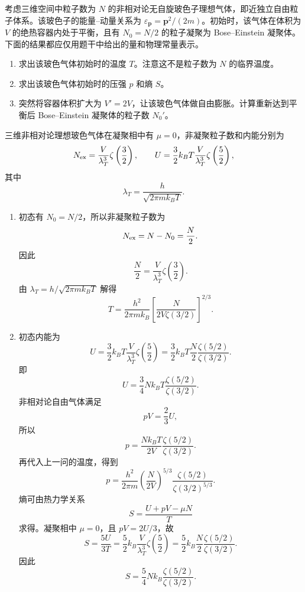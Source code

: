 \begin{question}[25 分]
考虑三维空间中粒子数为 $N$ 的非相对论无自旋玻色子理想气体，即近独立自由粒子体系。该玻色子的能量--动量关系为 $\varepsilon_{\mathbf p}=\mathbf p^2/(2m)$。初始时，该气体在体积为 $V$ 的绝热容器内处于平衡，且有 $N_0=N/2$ 的粒子凝聚为 Bose--Einstein 凝聚体。下面的结果都应仅用题干中给出的量和物理常量表示。
\begin{enumerate}
    \item 求出该玻色气体初始时的温度 $T$。注意这不是粒子数为 $N$ 的临界温度。
    \item 求出该玻色气体初始时的压强 $p$ 和熵 $S$。
    \item 突然将容器体积扩大为 $V'=2V$，让该玻色气体做自由膨胀。计算重新达到平衡后 Bose--Einstein 凝聚体的粒子数 $N_0'$。
\end{enumerate}
\begin{solution}
三维非相对论理想玻色气体在凝聚相中有 $\mu=0$，非凝聚粒子数和内能分别为
\[
    N_{\rm ex}=\frac{V}{\lambda_T^3}\zeta\left(\frac{3}{2}\right),
    \qquad
    U=\frac{3}{2}k_BT\frac{V}{\lambda_T^3}\zeta\left(\frac{5}{2}\right),
\]
其中
\[
    \lambda_T=\frac{h}{\sqrt{2\pi mk_BT}}.
\]
\begin{enumerate}
    \item 初态有 $N_0=N/2$，所以非凝聚粒子数为
    \[
        N_{\rm ex}=N-N_0=\frac{N}{2}.
    \]
    因此
    \[
        \frac{N}{2}=\frac{V}{\lambda_T^3}\zeta\left(\frac{3}{2}\right).
    \]
    由 $\lambda_T=h/\sqrt{2\pi mk_BT}$ 解得
    \[
        \boxed{T=\frac{h^2}{2\pi mk_B}
        \left[\frac{N}{2V\zeta(3/2)}\right]^{2/3}.}
    \]

    \item 初态内能为
    \[
        U=\frac{3}{2}k_BT\frac{V}{\lambda_T^3}\zeta\left(\frac{5}{2}\right)
        =\frac{3}{2}k_BT\frac{N}{2}\frac{\zeta(5/2)}{\zeta(3/2)}.
    \]
    即
    \[
        U=\frac{3}{4}Nk_BT\frac{\zeta(5/2)}{\zeta(3/2)}.
    \]
    非相对论自由气体满足
    \[
        pV=\frac{2}{3}U,
    \]
    所以
    \[
        p=\frac{Nk_BT}{2V}\frac{\zeta(5/2)}{\zeta(3/2)}.
    \]
    再代入上一问的温度，得到
    \[
        \boxed{
        p=\frac{h^2}{2\pi m}
        \left(\frac{N}{2V}\right)^{5/3}
        \frac{\zeta(5/2)}{\zeta(3/2)^{5/3}}.}
    \]
    熵可由热力学关系
    \[
        S=\frac{U+pV-\mu N}{T}
    \]
    求得。凝聚相中 $\mu=0$，且 $pV=2U/3$，故
    \[
        S=\frac{5U}{3T}
        =\frac{5}{2}k_B\frac{V}{\lambda_T^3}\zeta\left(\frac{5}{2}\right)
        =\frac{5}{2}k_B\frac{N}{2}\frac{\zeta(5/2)}{\zeta(3/2)}.
    \]
    因此
    \[
        \boxed{S=\frac{5}{4}Nk_B\frac{\zeta(5/2)}{\zeta(3/2)}.}
    \]


\end{enumerate}
\end{solution}
\end{question}
